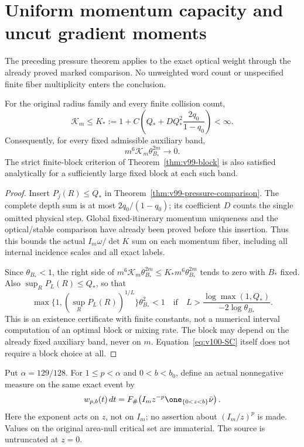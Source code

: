 \section{Uniform momentum capacity and uncut gradient moments}
\label{sec:v100-capacity}
The preceding pressure theorem applies to the exact optical weight
through the already proved marked comparison. No unweighted word
count or unspecified finite fiber multiplicity enters the conclusion.

\begin{theorem}
\label{thm:v100-capacity}
For the original radius family and every finite collision count,
\begin{equation}\label{eq:v100-capacity}
 \mathcal K_m\le K_*:=
 1+C\left(Q_*+D Q_*^2\frac{2q_0}{1-q_0}\right)<\infty.
\end{equation}
Consequently, for every fixed admissible auxiliary band,
\begin{equation}\label{eq:v100-SC}
       m^6\mathcal K_m\theta_{B_*}^{2m}\longrightarrow0.
\end{equation}
The strict finite-block criterion of Theorem~\ref{thm:v99-block}
is also satisfied analytically for a sufficiently large fixed block
at each such band.
\end{theorem}
\begin{proof}
Insert $P_j(R)\le Q_*$ in Theorem~\ref{thm:v99-pressure-comparison}.
The complete depth sum is at most $2q_0/(1-q_0)$; its coefficient
$D$ counts the single omitted physical step. Global fixed-itinerary
momentum uniqueness and the optical/stable comparison have already
been proved before this insertion. Thus this bounds the actual
$I_m\omega/\det K$ sum on each momentum fiber, including all
internal incidence scales and all exact labels.

Since $\theta_{B_*}<1$, the right side of
$m^6\mathcal K_m\theta_{B_*}^{2m}\le K_*m^6\theta_{B_*}^{2m}$
tends to zero with $B_*$ fixed. Also
$\sup_R P_L(R)\le Q_*$, so that
\[
 \max\{1,(\sup_R P_L(R))^{1/L}\}\theta_{B_*}^2<1
 \quad\text{if}\quad
 L>\frac{\log\max(1,Q_*)}{-2\log\theta_{B_*}}.
\]
This is an existence certificate with finite constants, not a
numerical interval computation of an optimal block or mixing rate.
The block may depend on the already fixed auxiliary band, never on
$m$. Equation~\eqref{eq:v100-SC} itself does not require a block
choice at all.
\end{proof}

Put $\alpha=129/128$. For $1\le p<\alpha$ and $0<b<b_0$, define
an actual nonnegative measure on the same exact event by
\begin{equation}\label{eq:v100-moment-source}
 w_{p,b}(t)\,dt
   =F_\#\!\left(I_m z^{-p}\one_{\{0<z<b\}}\bar\nu\right).
\end{equation}
Here the exponent acts on $z$, not on $I_m$; no assertion about
$(I_m/z)^p$ is made. Values on the original area-null critical set
are immaterial. The source is untruncated at $z=0$.

